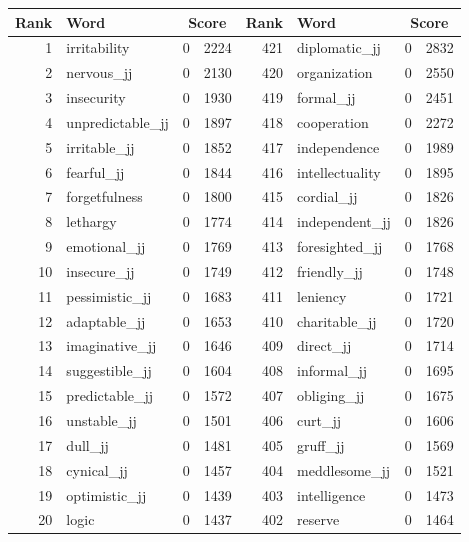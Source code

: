 \begin{table}[tbp]
    \begin{tabular}{| rlr@{.}l | rlr@{.}l |}
    \hline
    \textbf{Rank} & \textbf{Word} & \multicolumn{2}{c|}{\textbf{Score}} & \textbf{Rank} & \textbf{Word} & \multicolumn{2}{c|}{\textbf{Score}} \\
    \hline
    1 & irritability & 0 & 2224    &    421 & diplomatic\_jj & 0 & 2832 \\
    2 & nervous\_jj & 0 & 2130    &    420 & organization & 0 & 2550 \\
    3 & insecurity & 0 & 1930    &    419 & formal\_jj & 0 & 2451 \\
    4 & unpredictable\_jj & 0 & 1897    &    418 & cooperation & 0 & 2272 \\
    5 & irritable\_jj & 0 & 1852    &    417 & independence & 0 & 1989 \\
    6 & fearful\_jj & 0 & 1844    &    416 & intellectuality & 0 & 1895 \\
    7 & forgetfulness & 0 & 1800    &    415 & cordial\_jj & 0 & 1826 \\
    8 & lethargy & 0 & 1774    &    414 & independent\_jj & 0 & 1826 \\
    9 & emotional\_jj & 0 & 1769    &    413 & foresighted\_jj & 0 & 1768 \\
    10 & insecure\_jj & 0 & 1749    &    412 & friendly\_jj & 0 & 1748 \\
    11 & pessimistic\_jj & 0 & 1683    &    411 & leniency & 0 & 1721 \\
    12 & adaptable\_jj & 0 & 1653    &    410 & charitable\_jj & 0 & 1720 \\
    13 & imaginative\_jj & 0 & 1646    &    409 & direct\_jj & 0 & 1714 \\
    14 & suggestible\_jj & 0 & 1604    &    408 & informal\_jj & 0 & 1695 \\
    15 & predictable\_jj & 0 & 1572    &    407 & obliging\_jj & 0 & 1675 \\
    16 & unstable\_jj & 0 & 1501    &    406 & curt\_jj & 0 & 1606 \\
    17 & dull\_jj & 0 & 1481    &    405 & gruff\_jj & 0 & 1569 \\
    18 & cynical\_jj & 0 & 1457    &    404 & meddlesome\_jj & 0 & 1521 \\
    19 & optimistic\_jj & 0 & 1439    &    403 & intelligence & 0 & 1473 \\
    20 & logic & 0 & 1437    &    402 & reserve & 0 & 1464 \\

\end{tabular}
\end{table}
